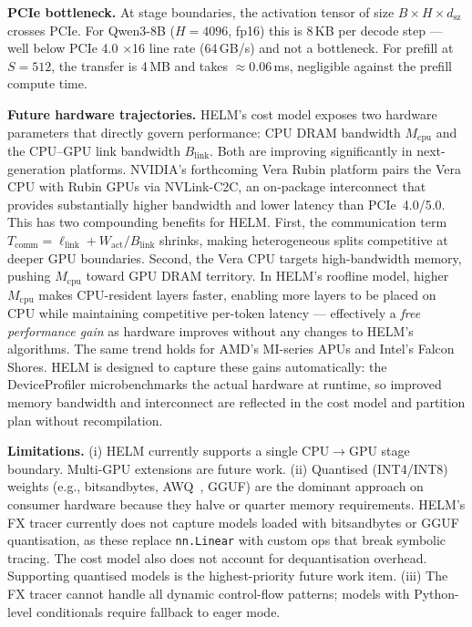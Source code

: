 \documentclass[lettersize,journal]{IEEEtran}
\begin{document}
\textbf{PCIe bottleneck.}
At stage boundaries, the activation tensor of size $B \times H \times d_\text{sz}$
crosses PCIe. For Qwen3-8B ($H = 4096$, fp16) this is 8\,KB per decode
step --- well below PCIe 4.0 $\times$16 line rate (64\,GB/s) and not
a bottleneck. For prefill at $S = 512$, the transfer is 4\,MB and takes
$\approx$0.06\,ms, negligible against the prefill compute time.

\textbf{Future hardware trajectories.}
HELM's cost model exposes two hardware parameters that directly govern
performance: CPU DRAM bandwidth $M_\text{cpu}$ and the CPU--GPU link
bandwidth $B_\text{link}$. Both are improving significantly in next-generation
platforms. NVIDIA's forthcoming Vera Rubin platform pairs the Vera CPU with
Rubin GPUs via NVLink-C2C, an on-package interconnect that provides
substantially higher bandwidth and lower latency than PCIe~4.0/5.0. This
has two compounding benefits for HELM. First, the communication term
$T_\text{comm} = \ell_\text{link} + W_\text{act}/B_\text{link}$ shrinks,
making heterogeneous splits competitive at deeper GPU boundaries. Second,
the Vera CPU targets high-bandwidth memory, pushing $M_\text{cpu}$ toward
GPU DRAM territory. In HELM's roofline model, higher $M_\text{cpu}$ makes
CPU-resident layers faster, enabling more layers to be placed on CPU while
maintaining competitive per-token latency --- effectively a \emph{free
performance gain} as hardware improves without any changes to HELM's
algorithms. The same trend holds for AMD's MI-series APUs and Intel's
Falcon Shores. HELM is designed to capture these gains automatically:
the DeviceProfiler microbenchmarks the actual hardware at runtime, so
improved memory bandwidth and interconnect are reflected in the cost model
and partition plan without recompilation.

\textbf{Limitations.}
(i) HELM currently supports a single CPU$\to$GPU stage boundary. Multi-GPU
extensions are future work. (ii) Quantised (INT4/INT8) weights (e.g., bitsandbytes, AWQ~\cite{awq},
GGUF) are the dominant approach on consumer hardware because they halve or
quarter memory requirements. HELM's FX tracer currently does not capture
models loaded with bitsandbytes or GGUF quantisation, as these replace
\texttt{nn.Linear} with custom ops that break symbolic tracing. The cost
model also does not account for dequantisation overhead. Supporting
quantised models is the highest-priority future work item. (iii) The FX tracer cannot handle all dynamic control-flow patterns;
models with Python-level conditionals require fallback to eager mode.
\end{document}
